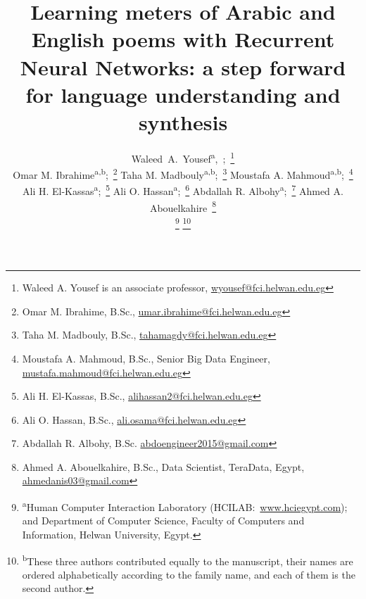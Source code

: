 \title{Learning meters of Arabic and English poems with Recurrent Neural Networks: a step forward
  for language understanding and synthesis}

\author{%
  Waleed~A.~Yousef\textsuperscript{a},~;~\thanks{Waleed
    A. Yousef is an associate professor, \url{wyousef@fci.helwan.edu.eg}}

  Omar M. Ibrahime\textsuperscript{a,b};~\thanks{Omar M. Ibrahime, B.Sc., \url{umar.ibrahime@fci.helwan.edu.eg}}
  Taha M. Madbouly\textsuperscript{a,b};~\thanks{Taha M. Madbouly, B.Sc., \url{tahamagdy@fci.helwan.edu.eg}} %
  Moustafa A. Mahmoud\textsuperscript{a,b};~\thanks{Moustafa A. Mahmoud, B.Sc., Senior Big Data Engineer, \url{mustafa.mahmoud@fci.helwan.edu.eg}}

  Ali H. El-Kassas\textsuperscript{a};~\thanks{Ali H. El-Kassas, B.Sc., \url{alihassan2@fci.helwan.edu.eg}}%
  Ali O. Hassan\textsuperscript{a};~\thanks{Ali O. Hassan, B.Sc., \url{ali.osama@fci.helwan.edu.eg}}%
  Abdallah R. Albohy\textsuperscript{a};~\thanks{Abdallah R. Albohy, B.Sc. \url{abdoengineer2015@gmail.com}}%
  Ahmed A. Abouelkahire~\thanks{Ahmed A. Abouelkahire, B.Sc., Data Scientist, TeraData, Egypt,
    \url{ahmedanis03@gmail.com}}%

  \thanks{\textsuperscript{a}Human Computer Interaction Laboratory (HCILAB:\
    \url{www.hciegypt.com}); and Department of Computer Science, Faculty of Computers and Information,
    Helwan University, Egypt.}
  \thanks{\textsuperscript{b}These three authors contributed equally
    to the manuscript, their names are ordered alphabetically according to the family name, and each
    of them is the second author.}
}

\maketitle


